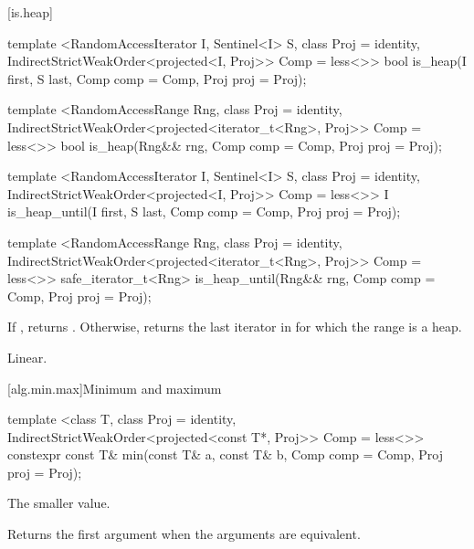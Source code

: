 [is.heap]{}

%
\begin{itemdecl}
template <RandomAccessIterator I, Sentinel<I> S, class Proj = identity,
    IndirectStrictWeakOrder<projected<I, Proj>> Comp = less<>>
  bool is_heap(I first, S last, Comp comp = Comp{}, Proj proj = Proj{});

template <RandomAccessRange Rng, class Proj = identity,
    IndirectStrictWeakOrder<projected<iterator_t<Rng>, Proj>> Comp = less<>>
  bool
    is_heap(Rng&& rng, Comp comp = Comp{}, Proj proj = Proj{});
\end{itemdecl}

\begin{itemdescr}
\pnum
\returns {}
\end{itemdescr}

%
\begin{itemdecl}
template <RandomAccessIterator I, Sentinel<I> S, class Proj = identity,
    IndirectStrictWeakOrder<projected<I, Proj>> Comp = less<>>
  I is_heap_until(I first, S last, Comp comp = Comp{}, Proj proj = Proj{});

template <RandomAccessRange Rng, class Proj = identity,
    IndirectStrictWeakOrder<projected<iterator_t<Rng>, Proj>> Comp = less<>>
  safe_iterator_t<Rng>
    is_heap_until(Rng&& rng, Comp comp = Comp{}, Proj proj = Proj{});
\end{itemdecl}

\begin{itemdescr}
\pnum
\returns If , returns
. Otherwise, returns
the last iterator  in  for which the
range  is a heap.

\pnum
\complexity Linear.
\end{itemdescr}

[alg.min.max]{Minimum and maximum}

%
\begin{itemdecl}
template <class T, class Proj = identity,
    IndirectStrictWeakOrder<projected<const T*, Proj>> Comp = less<>>
  constexpr const T& min(const T& a, const T& b, Comp comp = Comp{}, Proj proj = Proj{});
\end{itemdecl}

\begin{itemdescr}
\pnum
\returns
The smaller value.

\pnum
\notes
Returns the first argument when the arguments are equivalent.
\end{itemdescr}

